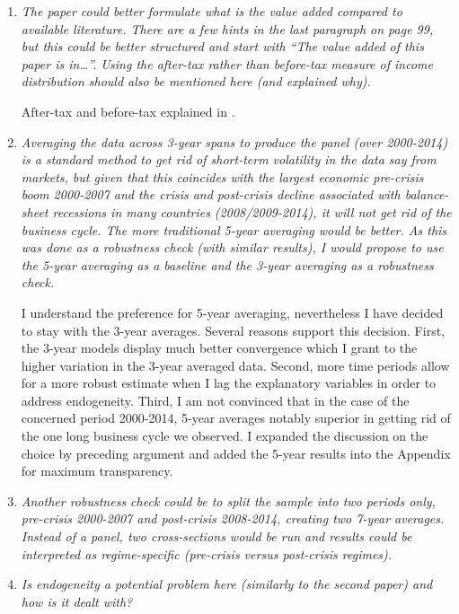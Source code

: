 \begin{enumerate}[resume]
    \item \textit{The paper could better formulate what is the value added compared to available literature. There are a few hints in the last paragraph on page 99, but this could be better structured and start with ``The value added of this paper is in\dots''. Using the after-tax rather than before-tax measure of income distribution should also be mentioned here (and explained why).}
    
    After-tax and before-tax explained in \textcite{de2017finance}.
    
    \item \textit{Averaging the data across 3-year spans to produce the panel (over 2000-2014) is a standard method to get rid of short-term volatility in the data say from markets, but given that this coincides with the largest economic pre-crisis boom 2000-2007 and the crisis and post-crisis decline associated with balance-sheet recessions in many countries (2008/2009-2014), it will not get rid of the business cycle. The more traditional 5-year averaging would be better. As this was done as a robustness check (with similar results), I would propose to use the 5-year averaging as a baseline and the 3-year averaging as a robustness check.}
    
    I understand the preference for 5-year averaging, nevertheless I have decided to stay with the 3-year averages. Several reasons support this decision. First, the 3-year models display much better convergence which I grant to the higher variation in the 3-year averaged data. Second, more time periods allow for a more robust estimate when I lag the explanatory variables in order to address endogeneity. {\color{red}Third, I am not convinced that in the case of the concerned period 2000-2014, 5-year averages notably superior in getting rid of the one long business cycle we observed}. I expanded the discussion on the choice by preceding argument and added the 5-year results into the Appendix for maximum transparency.

    \item \textit{Another robustness check could be to split the sample into two periods only, pre-crisis 2000-2007 and post-crisis 2008-2014, creating two 7-year averages. Instead of a panel, two cross-sections would be run and results could be interpreted as regime-specific (pre-crisis versus post-crisis regimes).}
    
    \item \textit{Is endogeneity a potential problem here (similarly to the second paper) and how is it dealt with?}
\end{enumerate}

